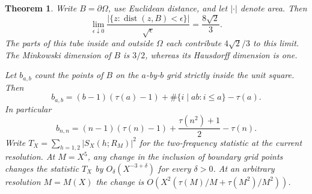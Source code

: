 \documentclass[11pt,a4paper,oneside,openany]{report}
\newtheorem{theorem}{Theorem}[section]
\theoremstyle{remark}\newtheorem{remark}[theorem]{Remark}
\numberwithin{equation}{section}
\begin{document}
\begin{theorem}
Write $B=\partial\Omega$, use Euclidean distance, and let $|\cdot|$
denote area. Then
\[
 \lim_{\epsilon\downarrow0}
 \frac{|\{z:\operatorname{dist}(z,B)<\epsilon\}|}{\sqrt\epsilon}
 =\frac{8\sqrt2}{3}.
\]
The parts of this tube inside and outside $\Omega$ each contribute
$4\sqrt2/3$ to this limit. The Minkowski dimension of $B$ is $3/2$,
whereas its Hausdorff dimension is one.

Let $b_{a,b}$ count the points of $B$ on the $a$-by-$b$ grid
strictly inside the unit square. Then
\[
 b_{a,b}
 =(b-1)(\tau(a)-1)
       +\#\{i\mid ab: i\le a\}-\tau(a).
\]
In particular
\[
 b_{n,n}
 =(n-1)(\tau(n)-1)+\frac{\tau(n^2)+1}{2}-\tau(n).
\]
Write $T_X=\sum_{h=1,2}|S_X(h;R_M)|^2$ for the two-frequency statistic at the current resolution. At $M=X^5$, any change in the inclusion of boundary grid points
changes the statistic $T_X$ by $O_\delta(X^{-3+\delta})$ for every
$\delta>0$. At an arbitrary resolution $M=M(X)$ the change is
$O(X^2(\tau(M)/M+\tau(M^2)/M^2))$.
\end{theorem}
\end{document}
